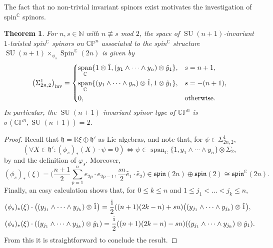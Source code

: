 \documentclass[pdftex]{sigma}
\numberwithin{equation}{section}
\newtheorem{Theorem}{Theorem}[section]
\newcommand{\C}{\mathbb{C}} %
\DeclareMathOperator{\vecspan}{span}
\DeclareMathOperator{\Spin}{Spin}
\DeclareMathOperator{\SU}{SU}
\begin{document}
		The fact that no non-trivial invariant spinors exist motivates the investigation of spin$^{\C}$ spinors.
		\begin{Theorem}\label{thm:inv_gen_cpn}
			For $n,s \in \mathbb{N}$ with $n \not\equiv s$ {\rm mod} $2$, the space of $\SU(n+1)$-invariant $1$-twisted spin$^{\mathbb{C}}$ spinors on $\mathbb{CP}^n$ associated to the spin$^{\mathbb{C}}$ structure $\SU(n+1) \times_{\phi_s} \Spin^{\mathbb{C}}(2n)$ is given by
			\begin{equation*}
				\bigl(\Sigma_{2n,2}^{1}\bigr)_{\mathrm{inv}} =
				\begin{dcases}
					\vecspan_{\mathbb{C}} \{ 1 \otimes \hat{1} , (y_1 \wedge \cdots \wedge y_n) \otimes \hat{y}_1 \}, & s = n+1 , \\
					\vecspan_{\mathbb{C}} \{ (y_1 \wedge \cdots \wedge y_n) \otimes \hat{1} , 1 \otimes \hat{y}_1 \}, & s = -(n+1) , \\
					0 ,& \text{otherwise} .
				\end{dcases}
			\end{equation*}
			In particular, the $\SU(n+1)$-invariant spinor type of $\mathbb{CP}^n$ is
$
			\sigma (\mathbb{CP}^n, \SU(n+1)) = 2 $.
		\end{Theorem}
		
		\begin{proof}
			Recall that $\mathfrak{h} = \mathbb{R}\xi \oplus \mathfrak{h}'$ as Lie algebras, and note that, for $\psi \in \Sigma_{2n,2}^{1}$,
			\[
			( \forall X \in \mathfrak{h}' \colon ( \phi_s )_* (X) \cdot \psi = 0 ) \iff \psi \in \vecspan_{\mathbb{C}} \{1,y_1 \wedge \cdots \wedge y_n \} \otimes \Sigma_2 ,
			\]
			by \cite[Theorem~3.7]{AHL} and the definition of $\varphi_s$. Moreover,
			\[
			(\phi_s)_* (\xi) = \Bigg( \frac{n+1}{2} \sum_{p=1}^{n} e_{2p} \cdot e_{2p-1} , \frac{sn}{2} \hat{e}_1 \cdot \hat{e}_2 \Bigg) \in \mathfrak{spin}(2n) \oplus \mathfrak{spin}(2) \cong \mathfrak{spin}^{\C}(2n) .
			\]
			Finally, an easy calculation shows that, for $0 \leq k \leq n$ and $1 \leq j_1 < \dots < j_k \leq n$,
			\begin{align*}
				&(\phi_s)_* (\xi) \cdot \bigl( ( y_{j_1} \wedge \cdots \wedge y_{j_k} ) \otimes \hat{1} \bigr) = \frac{{\rm i}}{2} ( (n+1)(2k-n) + sn ) \bigl( ( y_{j_1} \wedge \cdots \wedge y_{j_k} ) \otimes \hat{1} \bigr) , \\ &(\phi_s)_* (\xi) \cdot ( ( y_{j_1} \wedge \cdots \wedge y_{j_k} ) \otimes \hat{y}_1 ) = \frac{{\rm i}}{2} ( (n+1)(2k-n) - sn ) ( ( y_{j_1} \wedge \cdots \wedge y_{j_k} ) \otimes \hat{y}_1 ) .
			\end{align*}
			From this it is straightforward to conclude the result.
		\end{proof}
		
\end{document}
